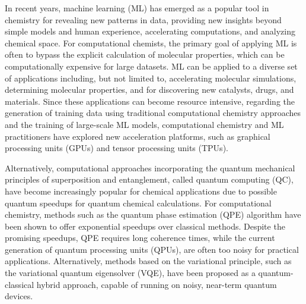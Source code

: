 \documentclass[journal=jacsat,manuscript=article]{achemso}
\begin{document}
In recent years, machine learning (ML) has emerged as a popular tool in chemistry for revealing new patterns in data, providing new insights beyond simple models and human experience, accelerating computations, and analyzing chemical space.
For computational chemists, the primary goal of applying ML is often to bypass the explicit calculation of molecular properties, which can be computationally expensive for large datasets.\cite{janet_machine_2020}
ML can be applied to a diverse set of applications including, but not limited to, accelerating molecular simulations\cite{behler_perspective_2016,ssmith_ani-1_2017,gao_torchani_2020}, determining molecular properties\cite{yang_analyzing_2019,ramakrishnan_quantum_2014,ramakrishnan_big_2015,hansen_machine_2015,unke_physnet_2019}, and for discovering new catalysts\cite{zhong_accelerated_2020,nandy_computational_2021,mjones_data-driven_2023}, drugs\cite{goh_deep_2017,yang_concepts_2019}, and materials.\cite{butler_machine_2018,sanchez-lengeling_inverse_2018,raccuglia_machine-learning-assisted_2016}
Since these applications can become resource intensive, regarding the generation of training data using traditional computational chemistry approaches and the training of large-scale ML models, computational chemistry and ML practitioners have explored new acceleration platforms, such as graphical processing units (GPUs) and tensor processing units (TPUs).\cite{ufimtsev_graphical_2008,gotz_chapter_2010,pederson_large_2023,goh_deep_2017,gawehn_advancing_2018,pandey_transformational_2022,ssmith_ani-1_2017}

Alternatively, computational approaches incorporating the quantum mechanical principles of superposition and entanglement, called quantum computing (QC),  have become increasingly popular for chemical applications due to possible quantum speedups for quantum chemical calculations.\cite{cao_quantum_2019}
For computational chemistry, methods such as the quantum phase estimation (QPE)\cite{abrams_simulation_1997,abrams_quantum_1999,aspuru-guzik_simulated_2005,lanyon_towards_2010,whitfield_simulation_2011,aspuru-guzik_photonic_2012} algorithm have been shown to offer exponential speedups over classical methods.
Despite the promising speedups, QPE requires long coherence times, while the current generation of quantum processing units (QPUs), are often too noisy for practical applications.
Alternatively, methods based on the variational principle, such as the variational quantum eigensolver (VQE)\cite{peruzzo_variational_2014,cerezo_variational_2021,mcclean_theory_2016,bharti_noisy_2022}, have been proposed as a quantum-classical hybrid approach, capable of running on noisy, near-term quantum devices.
\end{document}
